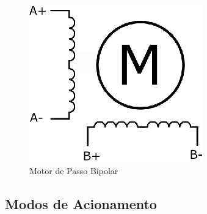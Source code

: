 \begin{figure}[H]
	\centering
	\includegraphics[width = 0.3\columnwidth]{images/MotorDePassoBipolar.eps}
	\caption{Motor de Passo Bipolar}
	\label{fig:MotorDePassoBipolar}
\end{figure}


\subsection{Modos de Acionamento} 